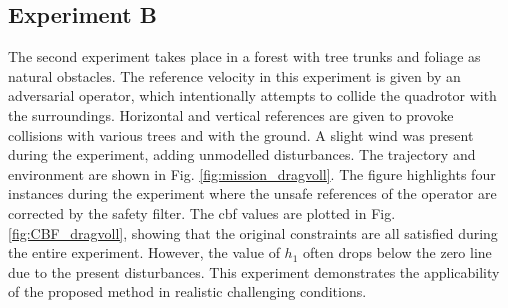 \subsection{Experiment B}
The second experiment takes place in a forest with tree trunks
and foliage as natural obstacles. The reference velocity in this experiment is given by an adversarial operator, which intentionally attempts to collide the quadrotor with the surroundings. Horizontal and vertical references are given to provoke collisions with various trees and with the ground. A slight wind was present during the experiment, adding unmodelled disturbances. The trajectory and environment are shown in Fig. \ref{fig:mission_dragvoll}. The figure highlights four instances during the experiment where the unsafe references of the operator are corrected by the safety filter. The \ac{cbf} values are plotted in Fig. \ref{fig:CBF_dragvoll}, showing that the original constraints are all satisfied during the entire experiment. However, the value of $h_1$ often drops below the zero line due to the present disturbances. This experiment demonstrates the applicability of the proposed method in realistic challenging conditions.
